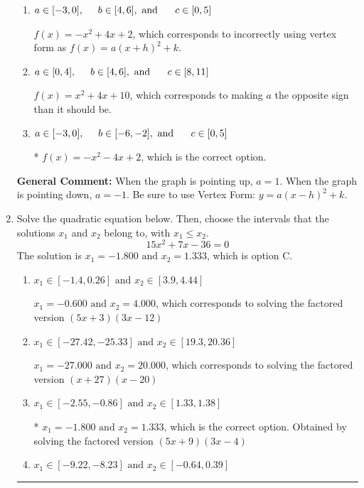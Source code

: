 \documentclass{extbook}[14pt]
\newcommand{\litem}[1]{\item #1

\rule{\textwidth}{0.4pt}}
\begin{document}
\begin{enumerate}
{\begin{enumerate}[label=\Alph*.]
$f(x)=-x^{2} +4 x -10$, which corresponds to incorrectly using vertex form as $f(x) = a(x+h)^2 - k$.
\item \( a \in [-3, 0], \hspace*{5mm} b \in [4, 6], \text{ and } \hspace*{5mm} c \in [0, 5] \)

$f(x)=-x^{2} +4 x + 2$, which corresponds to incorrectly using vertex form as $f(x) = a(x+h)^2+k$.
\item \( a \in [0, 4], \hspace*{5mm} b \in [4, 6], \text{ and } \hspace*{5mm} c \in [8, 11] \)

$f(x)=x^{2} +4 x + 10$, which corresponds to making $a$ the opposite sign than it should be.
\item \( a \in [-3, 0], \hspace*{5mm} b \in [-6, -2], \text{ and } \hspace*{5mm} c \in [0, 5] \)

* $f(x)=-x^{2} -4 x + 2$, which is the correct option.
\end{enumerate}

\textbf{General Comment:} When the graph is pointing up, $a=1$. When the graph is pointing down, $a=-1$. Be sure to use Vertex Form: $y = a(x-h)^2+k$.
}
\litem{
Solve the quadratic equation below. Then, choose the intervals that the solutions $x_1$ and $x_2$ belong to, with $x_1 \leq x_2$.
\[ 15x^{2} +7 x -36 = 0 \]The solution is \( x_1 = -1.800 \text{ and } x_2 = 1.333 \), which is option C.\begin{enumerate}[label=\Alph*.]
\item \( x_1 \in [-1.4, 0.26] \text{ and } x_2 \in [3.9, 4.44] \)

$x_1 = -0.600 \text{ and } x_2 = 4.000$, which corresponds to solving the factored version $(5x + 3)(3x -12)$
\item \( x_1 \in [-27.42, -25.33] \text{ and } x_2 \in [19.3, 20.36] \)

$x_1 = -27.000 \text{ and } x_2 = 20.000$, which corresponds to solving the factored version $(x + 27)(x -20)$
\item \( x_1 \in [-2.55, -0.86] \text{ and } x_2 \in [1.33, 1.38] \)

* $x_1 = -1.800 \text{ and } x_2 = 1.333$, which is the correct option. Obtained by solving the factored version $(5x + 9)(3x -4)$
\item \( x_1 \in [-9.22, -8.23] \text{ and } x_2 \in [-0.64, 0.39] \)


\end{enumerate}}
\end{enumerate}
\end{document}
